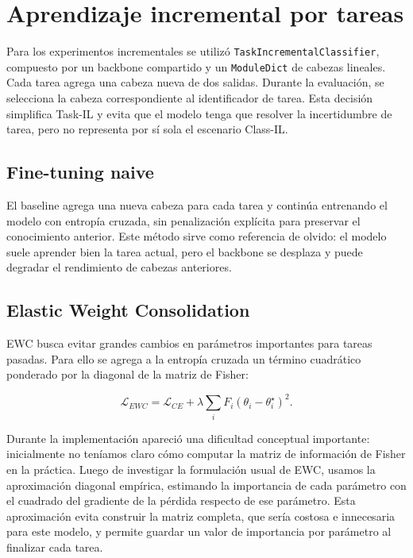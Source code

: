 \documentclass[10pt,a4paper]{article}
\begin{document}
\section{Aprendizaje incremental por tareas}

Para los experimentos incrementales se utilizó \texttt{TaskIncrementalClassifier}, compuesto por un backbone compartido y un \texttt{ModuleDict} de cabezas lineales. Cada tarea agrega una cabeza nueva de dos salidas. Durante la evaluación, se selecciona la cabeza correspondiente al identificador de tarea. Esta decisión simplifica Task-IL y evita que el modelo tenga que resolver la incertidumbre de tarea, pero no representa por sí sola el escenario Class-IL.

\subsection{Fine-tuning naive}

El baseline agrega una nueva cabeza para cada tarea y continúa entrenando el modelo con entropía cruzada, sin penalización explícita para preservar el conocimiento anterior. Este método sirve como referencia de olvido: el modelo suele aprender bien la tarea actual, pero el backbone se desplaza y puede degradar el rendimiento de cabezas anteriores.

\subsection{Elastic Weight Consolidation}

EWC busca evitar grandes cambios en parámetros importantes para tareas pasadas. Para ello se agrega a la entropía cruzada un término cuadrático ponderado por la diagonal de la matriz de Fisher:

\begin{equation}
\mathcal{L}_{EWC} =
\mathcal{L}_{CE} +
\lambda \sum_i F_i(\theta_i-\theta_i^\star)^2.
\end{equation}

Durante la implementación apareció una dificultad conceptual importante: inicialmente no teníamos claro cómo computar la matriz de información de Fisher en la práctica. Luego de investigar la formulación usual de EWC, usamos la aproximación diagonal empírica, estimando la importancia de cada parámetro con el cuadrado del gradiente de la pérdida respecto de ese parámetro. Esta aproximación evita construir la matriz completa, que sería costosa e innecesaria para este modelo, y permite guardar un valor de importancia por parámetro al finalizar cada tarea.
\end{document}
